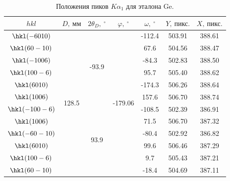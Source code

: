 \documentclass[a4paper,14pt]{extarticle}
\newcommand{\unit}[1]{ \ \text{#1}}
\newcommand{\degree}{^\circ}
\begin{document}
\begin{table}[ht!]
    \centering
    \begin{tabular}{ |c|c|c|c|c|c|c| }
        \hline
                   $hkl$ &           $D,\unit{мм}$ &  $2\theta_D, \ \degree$ &     $\varphi, \ \degree$ & $\omega, \ \degree$ &    $Y,\unit{пикс.}$ &    $X,\unit{пикс.}$ \\
        \hline
        $ \hkl(-6 0 10)$ & \multirow{12}{*}{128.5} &  \multirow{6}{*}{-93.9} & \multirow{12}{*}{-179.06}&              -112.4 &              503.91 &              388.61 \\
        $ \hkl(6 0 -10)$ &                         &                         &                          &                67.6 &              504.56 &              388.47 \\
        $ \hkl(-10 0 6)$ &                         &                         &                          &               -84.3 &              502.83 &              388.50 \\
        $ \hkl(10 0 -6)$ &                         &                         &                          &                95.7 &              505.40 &              388.62 \\
        $  \hkl(6 0 10)$ &                         &                         &                          &              -174.3 &              506.26 &              388.64 \\
        $  \hkl(10 0 6)$ &                         &                         &                          &               157.6 &              506.70 &              388.74 \\
        $\hkl(-10 0 -6)$ &                         &  \multirow{6}{*}{93.9}  &                          &              -108.5 &              502.39 &              386.91 \\
        $  \hkl(10 0 6)$ &                         &                         &                          &                71.5 &              506.70 &              387.32 \\
        $\hkl(-6 0 -10)$ &                         &                         &                          &               -80.4 &              502.92 &              386.82 \\
        $  \hkl(6 0 10)$ &                         &                         &                          &                99.6 &              506.46 &              387.29 \\
        $ \hkl(10 0 -6)$ &                         &                         &                          &                 9.7 &              505.43 &              387.21 \\
        $ \hkl(6 0 -10)$ &                         &                         &                          &               -18.4 &              504.69 &              387.11 \\
        \hline
    \end{tabular}
    \caption{Положения пиков $K\alpha_1$ для эталона Ge.}
    \label{tab:Ge}
\end{table}
\end{document}
